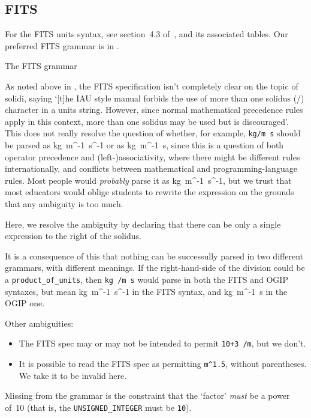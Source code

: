 \documentclass[12pt,notitlepage,onecolumn]{ivoa}
\makeatletter
\def\units{\@ifstar{\let\un@tsspace\relax    \un@ts}%
                   {\let\un@tsspace\thinspace\un@ts}}
\newcommand{\un@ts}[1]{{\let~\thinspace
  \ifmmode
    \un@tsspace\mathrm{#1}%
  \else
    \nobreak$\un@tsspace\mathrm{#1}$%
  \fi}}
\makeatother
\begin{document}
\subsection{FITS}
\label{sec:fitsgrammar}

For the FITS units syntax, see section~4.3 of~\cite{pence10}, and its
associated tables.  Our preferred FITS grammar is in
.

\begin{table}

\caption{\label{tabx:fitsgrammar}The FITS grammar}
\end{table}

As noted above in , 
the FITS specification isn't completely clear on the topic of 
solidi, saying `[t]he IAU style manual forbids
the use of more than one solidus (/) character in a units
string. However, since normal mathematical precedence rules apply
in this context, more than one solidus may be used but is
discouraged'.  This does not really resolve the question of whether, for
example, \texttt{kg/m s} should be parsed as \units{kg~m^{-1}~s^{-1}}
or as \units{kg~m^{-1}~s}, since this is a question of both operator
precedence and (left-)associativity, where there might be different
rules internationally, and conflicts between mathematical and
programming-language rules.  Most people would \emph{probably} parse
it as \units{kg~m^{-1}~s^{-1}}, but we trust that most educators would
oblige students to rewrite the expression on the grounds that any
ambiguity is too much.

Here, we resolve the ambiguity by declaring that there can
be only a single expression to the right of the solidus.

It is a consequence of this that nothing can be
successully parsed in two different grammars, with different
meanings.  If the right-hand-side of the division could be a
\texttt{product\_of\_units}, then \texttt{kg /m s} would parse in both
the FITS and OGIP syntaxes,
but mean \units{kg~m^{-1}~s^{-1}} in the FITS syntax, and
\units{kg~m^{-1}~s} in the OGIP one.

Other ambiguities:
\begin{itemize}
\item The FITS spec may or may not be intended to permit 
  \texttt{10+3 /m}, but we don't.
\item It is possible to read the FITS spec as permitting
  \texttt{m\^{}1.5}, without parentheses.  We take it to be
  invalid here.
\end{itemize}
Missing from the grammar is the constraint that the `factor'
\emph{must} be a power of~10 (that is, the \texttt{UNSIGNED\_INTEGER}
must be \texttt{10}).
\end{document}
